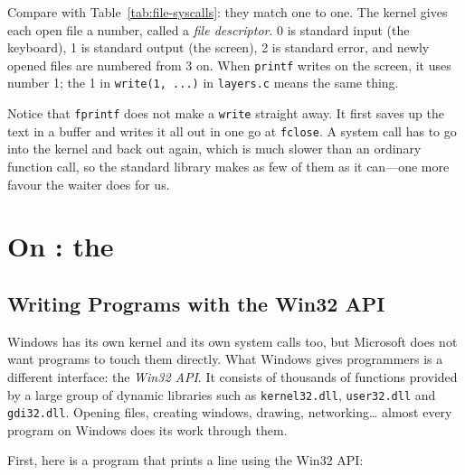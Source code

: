 Compare with Table~\ref{tab:file-syscalls}: they match one to one. The kernel gives each open file a number, called a \emph{file descriptor}. 0 is standard input (the keyboard), 1 is standard output (the screen), 2 is standard error, and newly opened files are numbered from 3 on. When \texttt{printf} writes on the screen, it uses number 1; the 1 in \texttt{write(1, ...)} in \texttt{layers.c} means the same thing.

Notice that \texttt{fprintf} does not make a \texttt{write} straight away. It first saves up the text in a buffer and writes it all out in one go at \texttt{fclose}. A system call has to go into the kernel and back out again, which is much slower than an ordinary function call, so the standard library makes as few of them as it can---one more favour the waiter does for us.

\section{On \texorpdfstring{}{Windows}: the \texorpdfstring{}{Win32 API}}
\label{sec:win32}

\subsection{Writing Programs with the Win32 API}

Windows has its own kernel and its own system calls too, but Microsoft does not want programs to touch them directly. What Windows gives programmers is a different interface: the \emph{Win32 API}. It consists of thousands of functions provided by a large group of dynamic libraries such as \texttt{kernel32.dll}, \texttt{user32.dll} and \texttt{gdi32.dll}. Opening files, creating windows, drawing, networking\ldots{} almost every program on Windows does its work through them.

First, here is a program that prints a line using the Win32 API:


